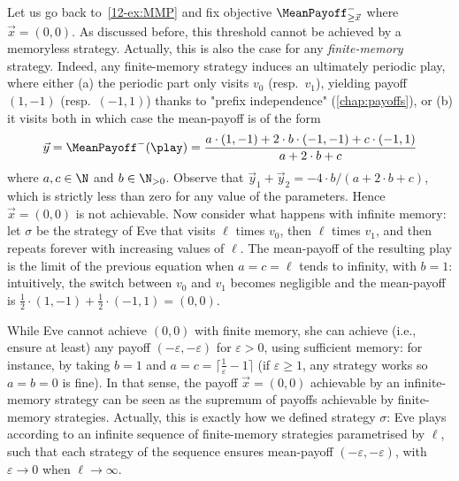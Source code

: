 \begin{example}
\label{12-ex:MMP2}
Let us go back to~\cref{12-ex:MMP} and fix objective $\MeanPayoff^{-}_{\geq \vec{x}}$ where $\vec{x} = (0, 0)$. As discussed before, this threshold cannot be achieved by a memoryless strategy. Actually, this is also the case for any \emph{finite-memory} strategy. Indeed, any finite-memory strategy induces an ultimately periodic play, where either (a) the periodic part only visits $v_0$ (resp.~$v_1$), yielding payoff $(1,-1)$ (resp.~$(-1,1)$) thanks to "prefix independence" (\cref{chap:payoffs}), or (b) it visits both in which case the mean-payoff is of the form
\[
\vec{y} = \MeanPayoff^{-}(\play) = \dfrac{a \cdot (1, -1) + 2 \cdot b \cdot (-1, -1) + c \cdot (-1, 1)}{a + 2 \cdot b + c}
\]
where $a, c \in \N$ and $b \in \N_{>0}$. Observe that $\vec{y}_1 + \vec{y}_2 = -4\cdot b / (a + 2 \cdot b + c)$, which is strictly less than zero for any value of the parameters. Hence $\vec{x} = (0, 0)$ is not achievable. Now consider what happens with infinite memory: let $\sigma$ be the strategy of Eve that visits $\ell$ times $v_0$, then $\ell$ times  $v_1$, and then repeats forever with increasing values of $\ell$. The mean-payoff of the resulting play is the limit of the previous equation when $a = c = \ell$ tends to infinity, with $b = 1$: intuitively, the switch between $v_0$ and $v_1$ becomes negligible and the mean-payoff is $\frac{1}{2} \cdot (1,-1) + \frac{1}{2}\cdot(-1,1) = (0, 0)$.
\end{example}

\begin{remark}
While Eve cannot achieve $(0, 0)$ with finite memory, she can achieve (i.e., ensure at least) any payoff $(-\varepsilon, -\varepsilon)$ for $\varepsilon > 0$, using sufficient memory: for instance, by taking $b = 1$ and $a = c = \lceil \frac{1}{\varepsilon} - 1\rceil$ (if $\varepsilon \geq 1$, any strategy works so $a = b = 0$ is fine). In that sense, the payoff $\vec{x} = (0, 0)$ achievable by an infinite-memory strategy can be seen as the supremum of payoffs achievable by finite-memory strategies. Actually, this is exactly how we defined strategy $\sigma$: Eve plays according to an infinite sequence of finite-memory strategies parametrised by $\ell$, such that each strategy of the sequence ensures mean-payoff $(-\varepsilon, -\varepsilon)$, with $\varepsilon \to 0$ when $\ell \to \infty$.
\end{remark}

